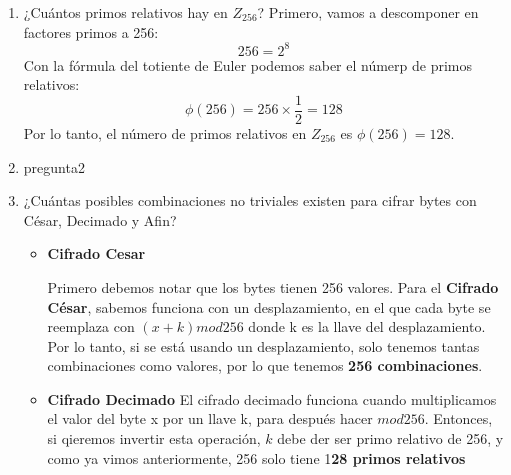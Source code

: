 \begin{enumerate}
\item ¿Cuántos primos relativos hay en $Z_{256}$?
Primero, vamos a descomponer en factores primos a 256:
  $$ 256 = 2^8$$
Con la fórmula del totiente de Euler podemos saber el númerp de primos relativos:
 $$\phi(256) = 256 \times \frac{1}{2} = 128$$
Por lo tanto, el número de primos relativos en $ Z_{256} $ es $ \phi(256) = 128 $.
\item pregunta2
\item ¿Cuántas posibles combinaciones no triviales existen para cifrar bytes con César, Decimado
y Afin?
\begin{itemize}
\item \textbf{Cifrado Cesar}

Primero debemos notar que los bytes tienen 256 valores.
Para el \textbf{Cifrado César},  sabemos funciona con un desplazamiento, en el que cada byte se reemplaza con $(x + k) mod 256$ donde k es la llave del desplazamiento. Por lo tanto, si se está usando un desplazamiento, solo tenemos tantas combinaciones como valores, por lo que tenemos \textbf{256 combinaciones}.

\item \textbf{Cifrado Decimado}
El cifrado decimado funciona cuando multiplicamos el valor del byte x por un llave k, para después hacer $mod 256$. Entonces, si qieremos invertir esta operación, $k$ debe der ser primo relativo  de 256, y como ya vimos anteriormente, 256 solo tiene 1\textbf{28 primos relativos} 


\end{itemize}
\end{enumerate}
